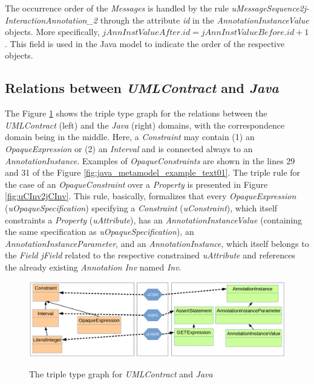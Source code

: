 \documentclass[tuberlin,cic,tc,english,noabntcite, oneside]{iiufrgs}
\begin{document}
The occurrence order of the \emph{Messages} is handled by the rule \emph{uMessageSequence2j- InteractionAnnotation\_2} through the attribute \emph{id} in the \emph{AnnotationInstanceValue} objects.
More specifically, $jAnnInstValueAfter.id = jAnnInstValueBefore.id + 1$. This field is used in the Java model to indicate the order of the respective objects.


\subsection{Relations between \emph{UMLContract} and \emph{Java}}
\label{subsec:UmlContracts2Java}

The Figure \ref{fig:umlContract2java_type} shows the triple type graph for the relations between the \emph{UMLContract} (left) and the \emph{Java} (right) domains, with the correspondence domain being in the middle. Here, a \emph{Constraint} may contain (1) an \emph{OpaqueExpression} or (2) an \emph{Interval} and is connected always to an \emph{AnnotationInstance}. Examples of \emph{OpaqueConstraints} are shown in the lines 29 and 31 of the Figure \ref{fig:java_metamodel_example_text01}. The triple rule for the case of an \emph{OpaqueConstraint} over a \emph{Property} is presented in Figure \ref{fig:uCInv2jCInv}. This rule, basically, formalizes that every \emph{OpaqueExpression} (\emph{uOpaqueSpecification}) specifying a \emph{Constraint} (\emph{uConstraint}), which itself constraints a \emph{Property} (\emph{uAttribute}), has an \emph{AnnotationInstanceValue} (containing the same specification as \emph{uOpaqueSpecification}), an \emph{AnnotationInstanceParameter}, and an \emph{AnnotationInstance}, which itself belongs to the \emph{Field} \emph{jField} related to the respective constrained \emph{uAttribute} and references the already existing \emph{Annotation} \emph{Inv} named \emph{Inv}.

\begin{figure}[H]
    \centering
    \caption{The triple type graph for \emph{UMLContract} and \emph{Java}}
    \includegraphics[width=.7\textwidth]{umlContract2java_type}
    \label{fig:umlContract2java_type}
\end{figure}
\end{document}
